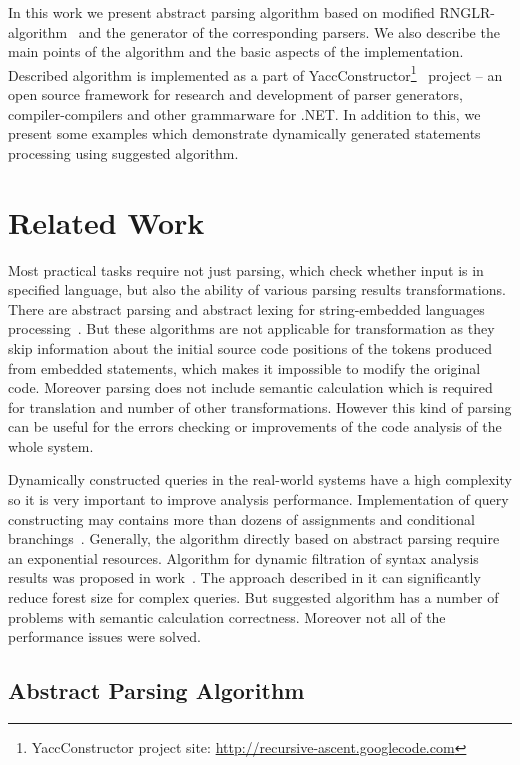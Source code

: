 \documentclass{acm_proc_article-sp}
\begin{document}
In this work we present abstract parsing algorithm based on modified RNGLR-algorithm~\cite{Scott:2006:RNG:1146809.1146810} and  the generator of the corresponding parsers. We also describe the main points of the algorithm and the basic aspects of the implementation. Described algorithm is implemented as a part of YaccConstructor\footnote{YaccConstructor project site: \href{http://recursive-ascent.googlecode.com}{http://recursive-ascent.googlecode.com}}~\cite{GrigorevKirilenkoYC} project -- an open source framework for research and development of parser generators, compiler-compilers and other grammarware for .NET. In addition to this, we present some examples which demonstrate dynamically generated statements processing using suggested algorithm.

\section{Related Work}

Most practical tasks require not just parsing, which check whether input is in specified language, but also the ability of various parsing results transformations. There are abstract parsing and abstract lexing for string-embedded languages processing~\cite{Doh:2009:APS:1615441.1615461}. But these algorithms are not applicable for transformation as they skip information about the initial source code positions of the tokens produced from embedded statements, which makes it impossible to modify the original code. Moreover parsing does not include semantic calculation which is required for translation and number of other transformations. However this kind of parsing can be useful for the errors checking or improvements of the code analysis of the whole system.
 
Dynamically constructed queries in the real-world systems have a high complexity so it is very important to improve analysis performance. Implementation of query constructing may contains more than dozens of assignments and conditional branchings~\cite{GrigorevDSQL}. Generally, the algorithm directly based on abstract parsing require an exponential resources. Algorithm for dynamic filtration of syntax analysis results was proposed in work~\cite{GrigorevDSQL}. The approach described in it can significantly reduce forest size for complex queries. But suggested algorithm has a number of problems with semantic calculation correctness. Moreover not all of the performance issues were solved.

\subsection{Abstract Parsing Algorithm}
\end{document}
